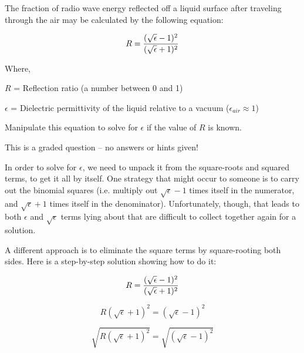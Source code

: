 

The fraction of radio wave energy reflected off a liquid surface after traveling through the air may be calculated by the following equation:

$$R = {(\sqrt{\epsilon} - 1)^2 \over (\sqrt{\epsilon} + 1)^2}$$

\noindent
Where,

$R$ = Reflection ratio (a number between 0 and 1)

$\epsilon$ = Dielectric permittivity of the liquid relative to a vacuum ($\epsilon_{air} \approx 1$)

\vskip 10pt

Manipulate this equation to solve for $\epsilon$ if the value of $R$ is known.

\vfil

\eject






This is a graded question -- no answers or hints given!
 






In order to solve for $\epsilon$, we need to unpack it from the square-roots and squared terms, to get it all by itself.  One strategy that might occur to someone is to carry out the binomial squares (i.e. multiply out $\sqrt{\epsilon} - 1$ times itself in the numerator, and $\sqrt{\epsilon} + 1$ times itself in the denominator).  Unfortunately, though, that leads to both $\epsilon$ and $\sqrt{\epsilon}$ terms lying about that are difficult to collect together again for a solution.

A different approach is to eliminate the square terms by square-rooting both sides.  Here is a step-by-step solution showing how to do it:

$$R = {(\sqrt{\epsilon} - 1)^2 \over (\sqrt{\epsilon} + 1)^2}$$

$$R (\sqrt{\epsilon} + 1)^2 = (\sqrt{\epsilon} - 1)^2$$

$$\sqrt{R (\sqrt{\epsilon} + 1)^2} = \sqrt{(\sqrt{\epsilon} - 1)^2}$$

